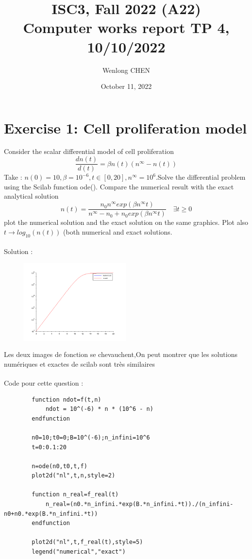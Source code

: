 \documentclass[11pt]{article}
\title{ISC3, Fall 2022 (A22) \\
 Computer works report TP 4, 10/10/2022}
\author{Wenlong CHEN}
\date{October 11, 2022}
\begin{document}
    \maketitle
    \section*{Exercise 1: Cell proliferation model}
    Consider the scalar differential model of cell proliferation
    \[\frac{dn(t)}{d(t)}=\beta n(t)(n^\infty-n(t))\]
    Take : $n(0)=10, \beta=10^{-6},t\in[0,20],n^\infty=10^6$.Solve the differential problem using the Scilab function ode(). Compare the numerical result with the exact analytical solution\\
    \[n(t)=\frac{n_0n^\infty exp(\beta n^\infty t)}{n^\infty-n_0+n_0exp(\beta n^\infty t)} \quad \exists t\ge 0\]
    plot the numerical solution and the exact solution on the same graphics. Plot also $t\rightarrow log_{10}(n(t))$ (both numerical and exact solutions.\\
    ~\\
    Solution : 
    \begin{figure}[H]
        \centering
        \includegraphics[width=0.5\textwidth,height=0.3\textwidth]{E1}
    \end{figure}
    Les deux images de fonction se chevauchent,On peut montrer que les solutions numériques et exactes de scilab sont très similaires\\
    ~\\
    Code pour cette question :
    \begin{verbatim}
        function ndot=f(t,n)
            ndot = 10^(-6) * n * (10^6 - n)
        endfunction

        n0=10;t0=0;B=10^(-6);n_infini=10^6
        t=0:0.1:20

        n=ode(n0,t0,t,f)
        plot2d("nl",t,n,style=2)

        function n_real=f_real(t)
            n_real=(n0.*n_infini.*exp(B.*n_infini.*t))./(n_infini-n0+n0.*exp(B.*n_infini.*t))
        endfunction

        plot2d("nl",t,f_real(t),style=5)
        legend("numerical","exact")
    \end{verbatim}
    
\end{document}
